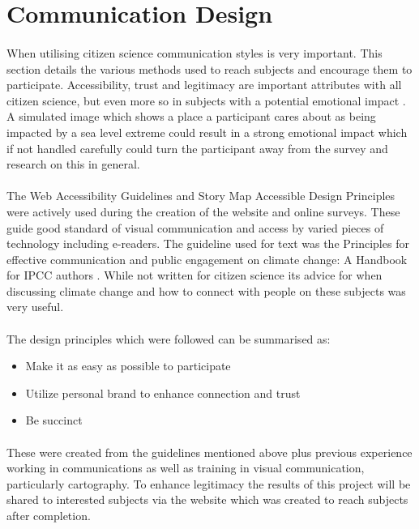 \section{Communication Design}
\paragraph{}
When utilising citizen science communication styles is very important. This section details the various methods used to reach subjects and encourage them to participate. Accessibility, trust and legitimacy are important attributes with all citizen science, but even more so in subjects with a potential emotional impact \cite{tweddle_guide_2012}. A simulated image which shows a place a participant cares about as being impacted by a sea level extreme could result in a strong emotional impact which if not handled carefully could turn the participant away from the survey and research on this in general.
\paragraph{}
The Web Accessibility Guidelines \cite{henry_web_2022} and Story Map Accessible Design Principles \cite{todd_liz_getting_nodate} were actively used during the creation of the website and online surveys. These guide good standard of visual communication and access by varied pieces of technology including e-readers. The guideline used for text  was the Principles for effective communication and public engagement on	climate change: A Handbook for IPCC authors \cite{corner_a_principles_2018}. While not written for citizen science its advice for when discussing climate change and how to connect with people on these subjects was very useful. 
\paragraph{}
The design principles which were followed can be summarised as:
\begin{itemize}
    \item Make it as easy as possible to participate
    \item Utilize personal brand to enhance connection and trust
    \item Be succinct
\end{itemize}
\paragraph{}
These were created from the guidelines mentioned above plus previous experience working in communications as well as training in visual communication, particularly cartography. To enhance legitimacy the results of this project will be shared to interested subjects via the website which was created to reach subjects after completion. 
